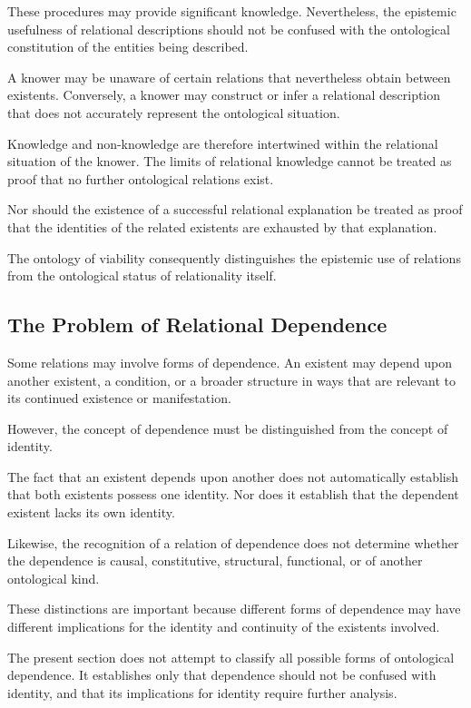 These procedures may provide significant knowledge. Nevertheless, the epistemic usefulness of relational descriptions should not be confused with the ontological constitution of the entities being described.

A knower may be unaware of certain relations that nevertheless obtain between existents. Conversely, a knower may construct or infer a relational description that does not accurately represent the ontological situation.

Knowledge and non-knowledge are therefore intertwined within the relational situation of the knower. The limits of relational knowledge cannot be treated as proof that no further ontological relations exist.

Nor should the existence of a successful relational explanation be treated as proof that the identities of the related existents are exhausted by that explanation.

The ontology of viability consequently distinguishes the epistemic use of relations from the ontological status of relationality itself.

\subsection{The Problem of Relational Dependence}

Some relations may involve forms of dependence. An existent may depend upon another existent, a condition, or a broader structure in ways that are relevant to its continued existence or manifestation.

However, the concept of dependence must be distinguished from the concept of identity.

The fact that an existent depends upon another does not automatically establish that both existents possess one identity. Nor does it establish that the dependent existent lacks its own identity.

Likewise, the recognition of a relation of dependence does not determine whether the dependence is causal, constitutive, structural, functional, or of another ontological kind.

These distinctions are important because different forms of dependence may have different implications for the identity and continuity of the existents involved.

The present section does not attempt to classify all possible forms of ontological dependence. It establishes only that dependence should not be confused with identity, and that its implications for identity require further analysis.

